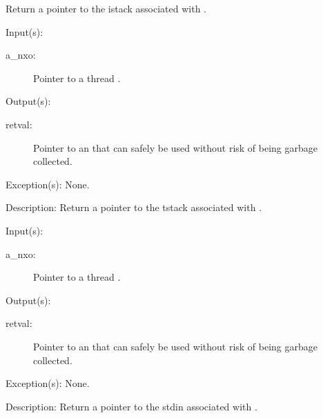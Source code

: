 \begin{capi}
\begin{capilist}
		Return a pointer to the istack associated with .
	\end{capilist}
\label{nxo_thread_tstack_get}
	\begin{capilist}
	\item[Input(s): ]
		\begin{description}\item[]
		\item[a\_nxo: ]
			Pointer to a thread .
		\end{description}
	\item[Output(s): ]
		\begin{description}\item[]
		\item[retval: ]
			Pointer to an  that can safely be used
			without risk of being garbage collected.
		\end{description}
	\item[Exception(s): ] None.
	\item[Description: ]
		Return a pointer to the tstack associated with .
	\end{capilist}
\label{nxo_thread_stdin_get}
	\begin{capilist}
	\item[Input(s): ]
		\begin{description}\item[]
		\item[a\_nxo: ]
			Pointer to a thread \classname{nxo}.
		\end{description}
	\item[Output(s): ]
		\begin{description}\item[]
		\item[retval: ]
			Pointer to an  that can safely be used
			without risk of being garbage collected.
		\end{description}
	\item[Exception(s): ] None.
	\item[Description: ]
		Return a pointer to the stdin associated with \cvar{a\_nxo}.
	\end{capilist}
\label{nxo_thread_stdin_set}
\end{capi}
